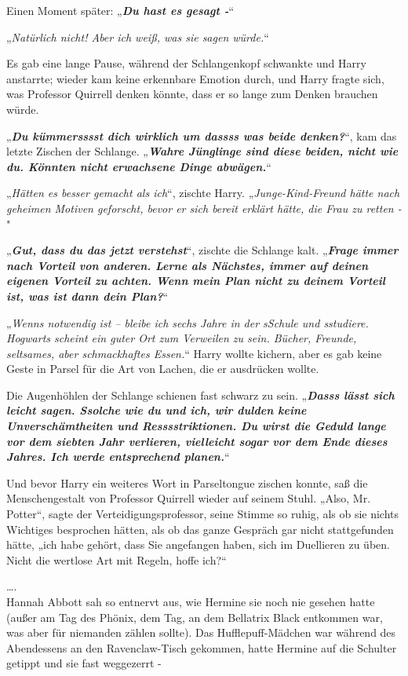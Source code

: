 {Einen Moment später: „\textbf{\emph{Du hast es gesagt -}}“

„\emph{Natürlich nicht! Aber ich weiß, was sie sagen würde.}“

Es gab eine lange Pause, während der Schlangenkopf schwankte und Harry anstarrte; wieder kam keine erkennbare Emotion durch, und Harry fragte sich, was Professor Quirrell denken könnte, dass er so lange zum Denken brauchen würde.

„\textbf{\emph{Du kümmersssst dich wirklich um dassss was beide denken?}}“, kam das letzte Zischen der Schlange. „\textbf{\emph{Wahre Jünglinge sind diese beiden, nicht wie du. Könnten nicht erwachsene Dinge abwägen.}}“

„\emph{Hätten es besser gemacht als ich}“, zischte Harry. „\emph{Junge-Kind-Freund hätte nach geheimen Motiven geforscht, bevor er sich bereit erklärt hätte, die Frau zu retten -}"

„\textbf{\emph{Gut, dass du das jetzt verstehst}}“, zischte die Schlange kalt. „\textbf{\emph{Frage immer nach Vorteil von anderen. Lerne als Nächstes, immer auf deinen eigenen Vorteil zu achten. Wenn mein Plan nicht zu deinem Vorteil ist, was ist dann dein Plan?}}“

„\emph{Wenns notwendig ist -- bleibe ich sechs Jahre in der sSchule und sstudiere. Hogwarts scheint ein guter Ort zum Verweilen zu sein. Bücher, Freunde, seltsames, aber schmackhaftes Essen.}“ Harry wollte kichern, aber es gab keine Geste in Parsel für die Art von Lachen, die er ausdrücken wollte.

Die Augenhöhlen der Schlange schienen fast schwarz zu sein. „\textbf{\emph{Dasss lässt sich leicht sagen. Ssolche wie du und ich, wir dulden keine Unverschämtheiten und Resssstriktionen. Du wirst die Geduld lange vor dem siebten Jahr verlieren, vielleicht sogar vor dem Ende dieses Jahres. Ich werde entsprechend planen.}}“

Und bevor Harry ein weiteres Wort in Parseltongue zischen konnte, saß die Menschengestalt von Professor Quirrell wieder auf seinem Stuhl. „Also, Mr. Potter“, sagte der Verteidigungsprofessor, seine Stimme so ruhig, als ob sie nichts Wichtiges besprochen hätten, als ob das ganze Gespräch gar nicht stattgefunden hätte, „ich habe gehört, dass Sie angefangen haben, sich im Duellieren zu üben. Nicht die wertlose Art mit Regeln, hoffe ich?“

….\\ Hannah Abbott sah so entnervt aus, wie Hermine sie noch nie gesehen hatte (außer am Tag des Phönix, dem Tag, an dem Bellatrix Black entkommen war, was aber für niemanden zählen sollte). Das Hufflepuff-Mädchen war während des Abendessens an den Ravenclaw-Tisch gekommen, hatte Hermine auf die Schulter getippt und sie fast weggezerrt -

}
